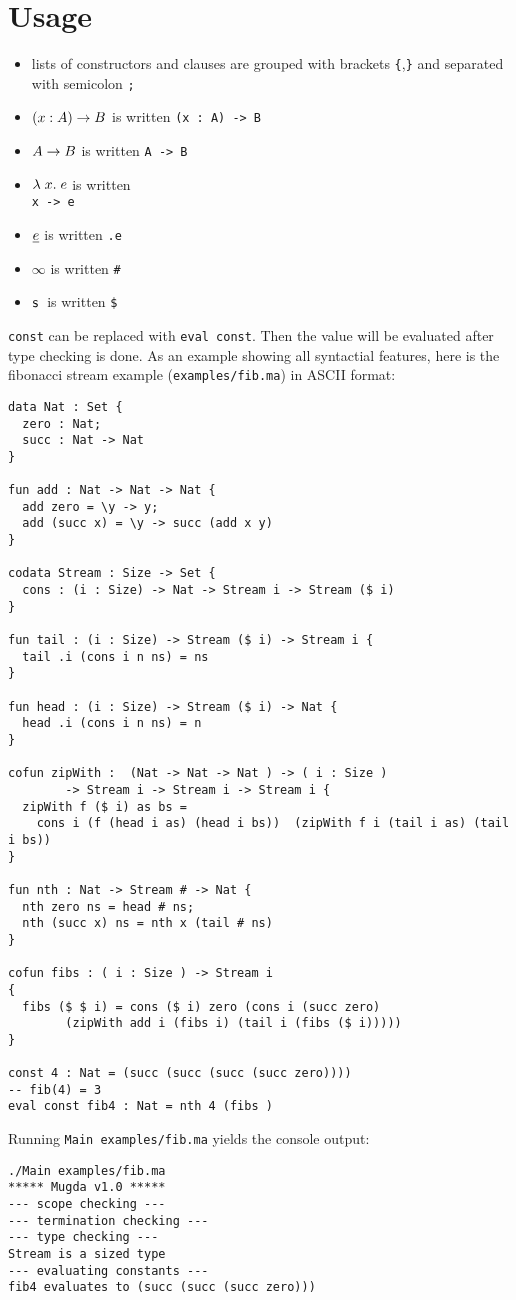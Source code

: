 \section{Usage}

\begin{itemize}
\item
lists of constructors and clauses are grouped with brackets \texttt{\{},\texttt{\}} and separated with semicolon \texttt{;}
\item
$( x : A ) \rightarrow{B}$ is written \texttt{(x : A) -> B }
\item
$A \rightarrow B$ is written \texttt{A -> B}
\item
$ \lambda\; x .\;e$ is written \texttt{\\ x -> e }
\item
$ \underline{e}$ is written \texttt {.e} 
\item
$ \infty$ is written \texttt{\#} 
\item
$\mathsf{s}\;$ is written \texttt{\$}
\end{itemize}
\texttt{const} can be replaced with {\texttt {eval const}}. Then the value will be evaluated after type checking is done.
As an example showing all syntactial features, here is the fibonacci stream example (\texttt{examples/fib.ma}) in ASCII format:
\begin{verbatim}
data Nat : Set {
  zero : Nat;
  succ : Nat -> Nat 
}

fun add : Nat -> Nat -> Nat {
  add zero = \y -> y;
  add (succ x) = \y -> succ (add x y)
}

codata Stream : Size -> Set {
  cons : (i : Size) -> Nat -> Stream i -> Stream ($ i)
}
 
fun tail : (i : Size) -> Stream ($ i) -> Stream i {
  tail .i (cons i n ns) = ns
}

fun head : (i : Size) -> Stream ($ i) -> Nat {
  head .i (cons i n ns) = n
}

cofun zipWith :  (Nat -> Nat -> Nat ) -> ( i : Size ) 
		-> Stream i -> Stream i -> Stream i {
  zipWith f ($ i) as bs = 
	cons i (f (head i as) (head i bs))  (zipWith f i (tail i as) (tail i bs)) 
}

fun nth : Nat -> Stream # -> Nat {
  nth zero ns = head # ns;
  nth (succ x) ns = nth x (tail # ns) 
}

cofun fibs : ( i : Size ) -> Stream i
{
  fibs ($ $ i) = cons ($ i) zero (cons i (succ zero)
	 	(zipWith add i (fibs i) (tail i (fibs ($ i)))))
}

const 4 : Nat = (succ (succ (succ (succ zero))))
-- fib(4) = 3 
eval const fib4 : Nat = nth 4 (fibs ) 

\end{verbatim}
Running \texttt{Main examples/fib.ma} yields the console output:
\begin{verbatim}
./Main examples/fib.ma
***** Mugda v1.0 *****
--- scope checking ---
--- termination checking ---
--- type checking ---
Stream is a sized type 
--- evaluating constants ---
fib4 evaluates to (succ (succ (succ zero)))

\end{verbatim}

